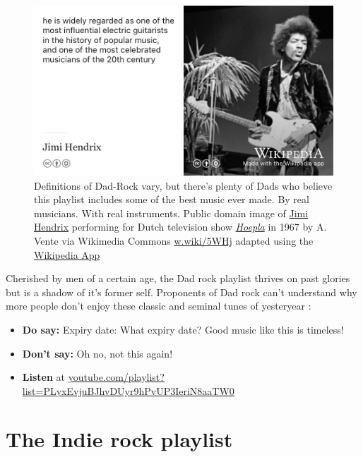\documentclass[
]{book}
\providecommand{\tightlist}{%
  \setlength{\itemsep}{0pt}\setlength{\parskip}{0pt}}
\begin{document}
\begin{figure}
\includegraphics[width=0.99\linewidth]{images/jimi-hendrix} \caption{Definitions of Dad-Rock vary, but there's plenty of Dads who believe this playlist includes some of the best music ever made. By real musicians. With real instruments. Public domain image of \href{https://en.wikipedia.org/wiki/Jimi_Hendrix}{Jimi Hendrix} performing for Dutch television show \emph{\href{https://en.wikipedia.org/wiki/Hoepla}{Hoepla}} in 1967 by A. Vente via Wikimedia Commons \href{https://w.wiki/5WHj}{w.wiki/5WHj} adapted using the \href{https://apps.apple.com/gb/app/wikipedia/id324715238}{Wikipedia App}}\label{fig:jimi-hendrix-fig}
\end{figure}



Cherished by men of a certain age, the Dad rock playlist thrives on past glories but is a shadow of it's former self. Proponents of Dad rock can't understand why more people don't enjoy these classic and seminal tunes of yesteryear \citep{dadrock, dadrock2}:

\begin{itemize}
\tightlist
\item
  \textbf{Do say:} Expiry date: What expiry date? Good music like this is timeless!
\item
  \textbf{Don't say:} Oh no, not this again!
\item
  \textbf{Listen} at \href{https://www.youtube.com/playlist?list=PLyxEvjuBJhvDUyr9hPvUP3IeriN8aaTW0}{youtube.com/playlist?list=PLyxEvjuBJhvDUyr9hPvUP3IeriN8aaTW0}
\end{itemize}

\hypertarget{indie}{%
\section{The Indie rock playlist}\label{indie}}
\end{document}
